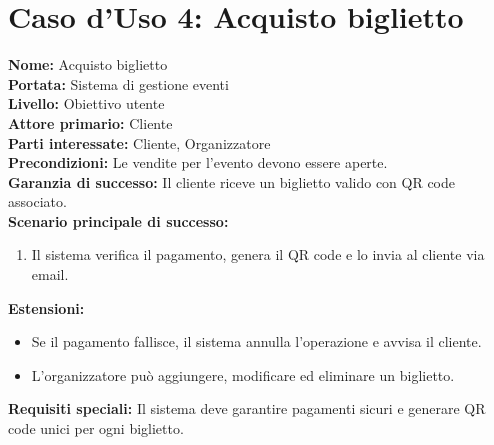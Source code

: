 \documentclass[a4paper,12pt]{article}
\begin{document}
\section*{\textcolor{sectioncolor}{Caso d'Uso 4: Acquisto biglietto}}
\textcolor{textcolor}{
\textbf{Nome:} Acquisto biglietto\\
\textbf{Portata:} Sistema di gestione eventi\\
\textbf{Livello:} Obiettivo utente\\
\textbf{Attore primario:} Cliente\\
\textbf{Parti interessate:} Cliente, Organizzatore\\
\textbf{Precondizioni:} Le vendite per l'evento devono essere aperte.\\
\textbf{Garanzia di successo:} Il cliente riceve un biglietto valido con QR code associato.\\
\textbf{Scenario principale di successo:}
\begin{enumerate}
    \item Il sistema verifica il pagamento, genera il QR code e lo invia al cliente via email.
\end{enumerate}
\textbf{Estensioni:}
\begin{itemize}
    \item  Se il pagamento fallisce, il sistema annulla l'operazione e avvisa il cliente.
    \item  L'organizzatore può aggiungere, modificare ed eliminare un biglietto.
\end{itemize}
\textbf{Requisiti speciali:} Il sistema deve garantire pagamenti sicuri e generare QR code unici per ogni biglietto.
}
\end{document}
